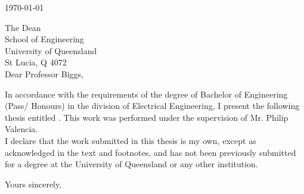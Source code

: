 \begin{flushright}
	
	\medskip
	\today
\end{flushright}
\begin{flushleft}
  The Dean\\
  School of Engineering\\
  University of Queensland\\
  St Lucia, Q 4072\\
  \bigskip\bigskip
  Dear Professor Biggs,
\end{flushleft}

In accordance with the requirements of the degree of Bachelor of
Engineering (Pass/ Honours) in the division of Electrical Engineering, I present the
following thesis entitled \Title . This work was performed  under the supervision of Mr. Philip Valencia.  \\

I declare that the work submitted in this thesis is my own, except as acknowledged in the text and footnotes, and has not been previously submitted for a degree at the University of Queensland or any other institution.

\begin{flushright}
	Yours sincerely,\\
	 \bigskip\bigskip\bigskip
	\Author
\end{flushright}

